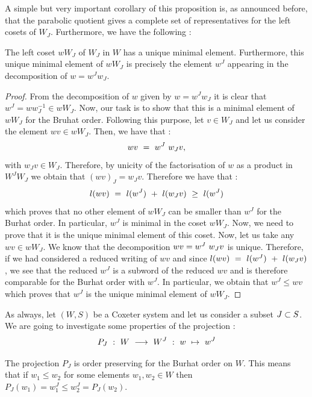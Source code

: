 A simple but very important corollary of this proposition is, as announced before, that the parabolic quotient gives a complete set of representatives for the left cosets of $W_J$. Furthermore, we have the following :
\begin{corollary}
	The left coset $wW_J$ of $W_J$ in $W$ has a unique minimal element. Furthermore, this unique minimal element of $wW_J$ is precisely the element $w^J$ appearing in the decomposition of $w=w^Jw_J$.
\end{corollary}
\begin{proof}
	From the decomposition of $w$ given by $w=w^Jw_J$ it is clear that $w^J=ww_J^{-1}\in wW_J$. Now, our task is to show that this is a minimal element of $wW_J$ for the Bruhat order. Following this purpose, let $v\in W_J$ and let us consider the element $wv\in wW_J$. Then, we have that :
	\begin{equation}
	wv\text{ }=\text{ } w^J\text{ } w_Jv,
	\end{equation}
	with $w_Jv\in W_J$. Therefore, by unicity of the factorisation of $w$ as a product in $W^JW_J$ we obtain that $(wv)_J=  w_Jv$. Therefore we have that :
	\begin{equation}
	l(wv)\text{ }=\text{ } l(w^J)\text{ }+\text{ } l(w_Jv)\text{ } \geq \text{ } l(w^J)
	\end{equation}
	which proves that no other element of $wW_J$ can be smaller than $w^J$ for the Burhat order. In particular, $w^J$ is minimal in the coset $wW_J$. Now, we need to prove that it is the unique minimal element of this coset. Now, let us take any $wv\in wW_J$. We know that the decomposition $wv=w^J\text{ } w_Jv$ is unique. Therefore, if we had considered a reduced writing of $wv$ and since $l(wv)\text{ }=\text{ } l(w^J)\text{ }+\text{ } l(w_Jv)$, we see that the reduced $w^J$ is a subword of the reduced $wv$ and is therefore comparable for the Burhat order with $w^J$. In particular, we obtain that $w^J\leq wv$ which proves that $w^J$ is the unique minimal element of $wW_J$.
\end{proof}
As always, let $(W,S)$ be a Coxeter system and let us consider a subset $J\subset S$. We are going to investigate some properties of the projection :
\begin{equation}
P_J\text{ }:\text{ } W\text{ }\longrightarrow\text{ } W^J\text{ } :\text{ } w\text{ } \mapsto\text{ } w^J
\end{equation}
\begin{proposition}
	The projection $P_J$ is order preserving for the Burhat order on $W$. This means that if $w_1\leq w_2$ for some elements $w_1,w_2\in W$ then $P_J(w_1)=w_1^J\leq w_2^J=P_J(w_2)$.
\end{proposition}
